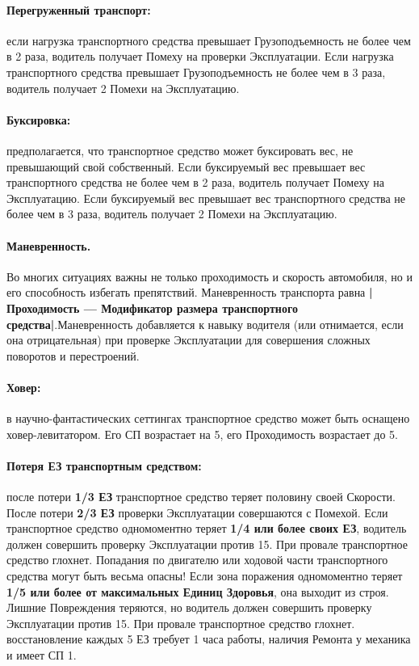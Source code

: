 \paragraph{Перегруженный транспорт:} если нагрузка транспортного средства превышает Грузоподъемность не более чем в 2 раза, водитель получает Помеху на проверки Эксплуатации. Если нагрузка транспортного средства превышает Грузоподъемность не более чем в 3 раза, водитель получает 2 Помехи на Эксплуатацию.
\paragraph{Буксировка:} предполагается, что транспортное средство может буксировать вес, не превышающий свой собственный. Если буксируемый вес превышает вес транспортного средства не более чем в 2 раза, водитель получает Помеху на Эксплуатацию. Если буксируемый вес превышает вес транспортного средства не более чем в 3 раза, водитель получает 2 Помехи на Эксплуатацию.
\paragraph{Маневренность.} Во многих ситуациях важны не только проходимость и скорость автомобиля, но и его способность избегать препятствий. Маневренность транспорта равна \textbf{|Проходимость — Модификатор размера транспортного средства|}.Маневренность добавляется к навыку
водителя (или отнимается, если она отрицательная) при проверке Эксплуатации для совершения сложных поворотов и перестроений.
\paragraph{Ховер:} в научно-фантастических сеттингах транспортное средство может быть оснащено ховер-левитатором. Его СП возрастает на 5, его Проходимость возрастает до 5.
\paragraph{Потеря ЕЗ транспортным средством:} после потери \textbf{1/3 ЕЗ}
транспортное средство теряет половину своей Скорости. После
потери \textbf{2/3 ЕЗ} проверки Эксплуатации совершаются с Помехой.
\newline
Если транспортное средство одномоментно теряет \textbf{1/4 или более своих ЕЗ}, водитель должен совершить проверку Эксплуатации против 15. При провале транспортное средство глохнет.
\newline
Попадания по двигателю или ходовой части транспортного средства могут быть весьма опасны! Если зона поражения одномоментно теряет \textbf{1/5 или более от максимальных Единиц Здоровья}, она выходит из строя. Лишние Повреждения теряются, но водитель должен совершить проверку Эксплуатации против 15. При провале транспортное средство глохнет.
 восстановление каждых 5 ЕЗ требует 1 часа работы, наличия Ремонта у механика и имеет СП 1.

